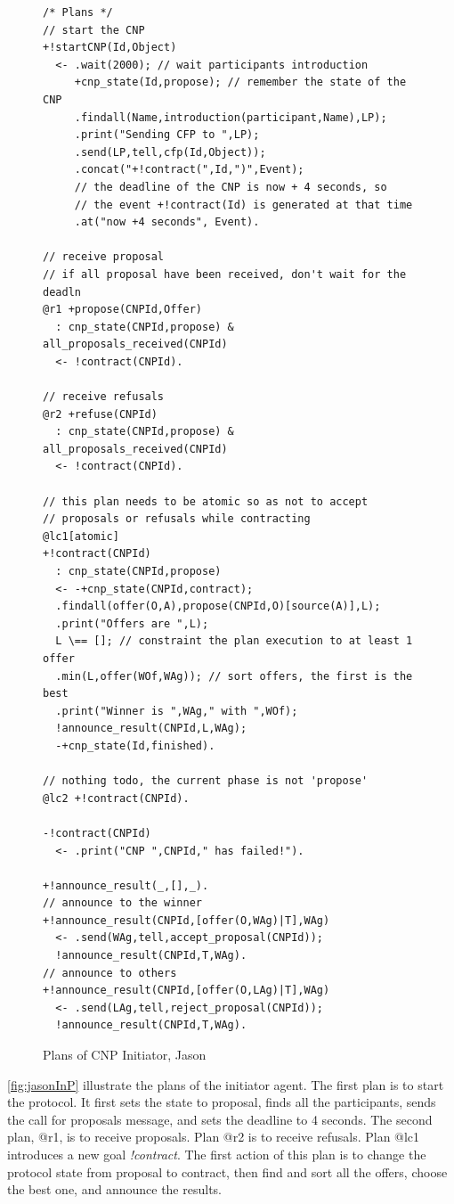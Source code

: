 \documentclass[a4paper,12pt,oneside,fleqn]{book} %
\begin{document}
\begin{figure}\footnotesize %
\begin{verbatim}
/* Plans */
// start the CNP
+!startCNP(Id,Object)
  <- .wait(2000); // wait participants introduction
     +cnp_state(Id,propose); // remember the state of the CNP
     .findall(Name,introduction(participant,Name),LP);
     .print("Sending CFP to ",LP);
     .send(LP,tell,cfp(Id,Object));
     .concat("+!contract(",Id,")",Event);
     // the deadline of the CNP is now + 4 seconds, so
     // the event +!contract(Id) is generated at that time
     .at("now +4 seconds", Event).

// receive proposal
// if all proposal have been received, don't wait for the deadln
@r1 +propose(CNPId,Offer)
  : cnp_state(CNPId,propose) & all_proposals_received(CNPId)
  <- !contract(CNPId).

// receive refusals
@r2 +refuse(CNPId)
  : cnp_state(CNPId,propose) & all_proposals_received(CNPId)
  <- !contract(CNPId).

// this plan needs to be atomic so as not to accept
// proposals or refusals while contracting
@lc1[atomic]
+!contract(CNPId)
  : cnp_state(CNPId,propose)
  <- -+cnp_state(CNPId,contract);
  .findall(offer(O,A),propose(CNPId,O)[source(A)],L);
  .print("Offers are ",L);
  L \== []; // constraint the plan execution to at least 1 offer
  .min(L,offer(WOf,WAg)); // sort offers, the first is the best
  .print("Winner is ",WAg," with ",WOf);
  !announce_result(CNPId,L,WAg);
  -+cnp_state(Id,finished).

// nothing todo, the current phase is not 'propose'
@lc2 +!contract(CNPId).

-!contract(CNPId)
  <- .print("CNP ",CNPId," has failed!").

+!announce_result(_,[],_).
// announce to the winner
+!announce_result(CNPId,[offer(O,WAg)|T],WAg)
  <- .send(WAg,tell,accept_proposal(CNPId));
  !announce_result(CNPId,T,WAg).
// announce to others
+!announce_result(CNPId,[offer(O,LAg)|T],WAg)
  <- .send(LAg,tell,reject_proposal(CNPId));
  !announce_result(CNPId,T,WAg).
\end{verbatim}
\caption{Plans of CNP Initiator, Jason}
\label{fig:jasonInP}
\end{figure} %

\autoref{fig:jasonInP} illustrate the plans of the initiator agent. The
first plan is to start the protocol. It first sets the state to proposal,
finds all the participants, sends the call for proposals message, and sets
the deadline to 4 seconds. The second plan, @r1, is to receive proposals.
Plan @r2 is to receive refusals. Plan @lc1 introduces a new goal
\textit{!contract}. The first action of this plan is to change the protocol
state from proposal to contract, then find and sort all the offers,
choose the best one, and announce the results.
\end{document}
